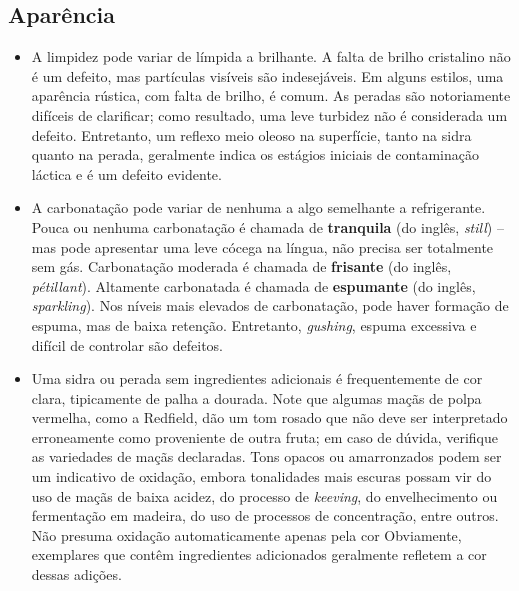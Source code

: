 \subsection*{Aparência}

\begin{itemize}
\item A limpidez pode variar de límpida a brilhante. A falta de brilho cristalino não é um defeito, mas partículas visíveis são indesejáveis. Em alguns estilos, uma aparência rústica, com falta de brilho, é comum. As peradas são notoriamente difíceis de clarificar; como resultado, uma leve turbidez não é considerada um defeito. Entretanto, um reflexo meio oleoso na superfície, tanto na sidra quanto na perada, geralmente indica os estágios iniciais de contaminação láctica e é um defeito evidente.
\item A carbonatação pode variar de nenhuma a algo semelhante a refrigerante. Pouca ou nenhuma carbonatação é chamada de \textbf{tranquila} (do inglês, \textit{still}) – mas pode apresentar uma leve cócega na língua, não precisa ser totalmente sem gás. Carbonatação moderada é chamada de \textbf{frisante} (do inglês, \textit{pétillant}). Altamente carbonatada é chamada de \textbf{espumante} (do inglês, \textit{sparkling}). Nos níveis mais elevados de carbonatação, pode haver formação de espuma, mas de baixa retenção. Entretanto, \textit{gushing}, espuma excessiva e difícil de controlar são defeitos.
\item Uma sidra ou perada sem ingredientes adicionais é frequentemente de cor clara, tipicamente de palha a dourada. Note que algumas maçãs de polpa vermelha, como a Redfield, dão um tom rosado que não deve ser interpretado erroneamente como proveniente de outra fruta; em caso de dúvida, verifique as variedades de maçãs declaradas. Tons opacos ou amarronzados podem ser um indicativo de oxidação, embora tonalidades mais escuras possam vir do uso de maçãs de baixa acidez, do processo de \textit{keeving}, do envelhecimento ou fermentação em madeira, do uso de processos de concentração, entre outros. Não presuma oxidação automaticamente apenas pela cor Obviamente, exemplares que contêm ingredientes adicionados geralmente refletem a cor dessas adições.
\end{itemize}
